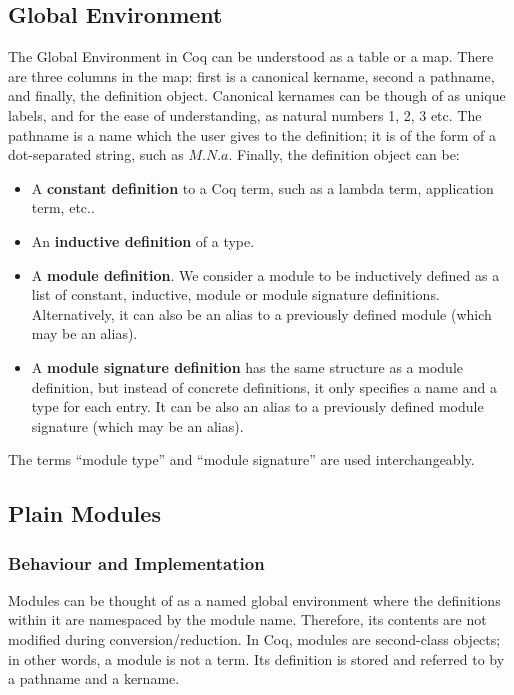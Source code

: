 \subsection{Global Environment}
The Global Environment in Coq can be understood as a table or a map. There are
three columns in the map: first is a canonical kername, second a pathname, and
finally, the definition object. Canonical kernames can be though of as unique
labels, and for the ease of understanding, as natural numbers 1, 2, 3 etc.
The pathname is a name which the user gives to the definition; it is of the form
of a dot-separated string, such as $M.N.a$. Finally, the definition object can
be:
\begin{itemize}

\item A \textbf{constant definition} to a Coq term, such as a lambda term,
application term, etc..

\item An \textbf{inductive definition} of a type.

\item A \textbf{module definition}. We consider a module to be inductively
defined as a list of constant, inductive, module or module signature
definitions. Alternatively, it can also be an alias to a previously defined
module (which may be an alias).

\item A \textbf{module signature definition} has the same structure as a module
definition, but instead of concrete definitions, it only specifies a name and a
type for each entry. It can be also an alias to a previously defined module
signature (which may be an alias).

\end{itemize}
The terms ``module type'' and ``module signature'' are used interchangeably.

\subsection{Plain Modules}
\label{sec:plainmodules}

\subsubsection{Behaviour and Implementation}

Modules can be thought of as a named global environment where the definitions
within it are namespaced by the module name. Therefore, its contents are not
modified during conversion/reduction.  In Coq, modules are second-class objects;
in other words, a module is not a term.  Its definition is stored and referred
to by a pathname and a kername.

